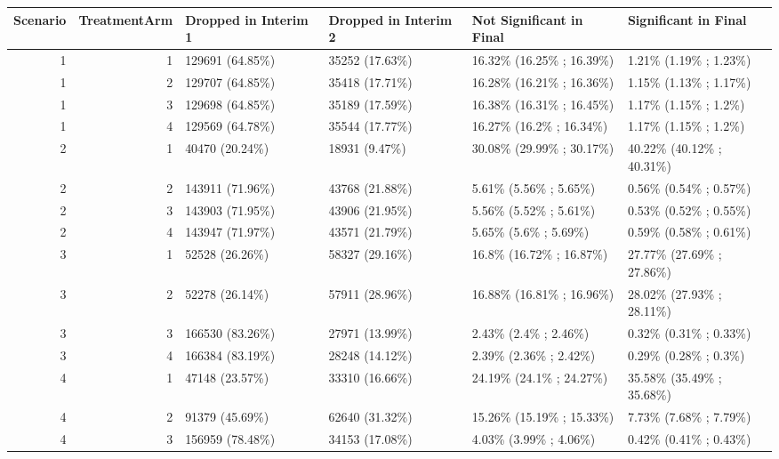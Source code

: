 \documentclass[11pt, a4paper]{article}\usepackage[]{graphicx}\usepackage[]{xcolor}
\begin{document}
\begin{landscape}
\begin{table}[ht]
\centering
\begin{tabular}{rrllll}
  \hline
Scenario & TreatmentArm & Dropped in Interim 1 & Dropped in Interim 2 & Not Significant in Final & Significant in Final \\ 
  \hline
  1 &   1 & 129691 (64.85\%) & 35252 (17.63\%) & 16.32\% (16.25\% ; 16.39\%) & 1.21\% (1.19\% ; 1.23\%) \\ 
    1 &   2 & 129707 (64.85\%) & 35418 (17.71\%) & 16.28\% (16.21\% ; 16.36\%) & 1.15\% (1.13\% ; 1.17\%) \\ 
    1 &   3 & 129698 (64.85\%) & 35189 (17.59\%) & 16.38\% (16.31\% ; 16.45\%) & 1.17\% (1.15\% ; 1.2\%) \\ 
    1 &   4 & 129569 (64.78\%) & 35544 (17.77\%) & 16.27\% (16.2\% ; 16.34\%) & 1.17\% (1.15\% ; 1.2\%) \\ 
   \hline 
  2 &   1 & 40470 (20.24\%) & 18931 (9.47\%) & 30.08\% (29.99\% ; 30.17\%) & 40.22\% (40.12\% ; 40.31\%) \\ 
    2 &   2 & 143911 (71.96\%) & 43768 (21.88\%) & 5.61\% (5.56\% ; 5.65\%) & 0.56\% (0.54\% ; 0.57\%) \\ 
    2 &   3 & 143903 (71.95\%) & 43906 (21.95\%) & 5.56\% (5.52\% ; 5.61\%) & 0.53\% (0.52\% ; 0.55\%) \\ 
    2 &   4 & 143947 (71.97\%) & 43571 (21.79\%) & 5.65\% (5.6\% ; 5.69\%) & 0.59\% (0.58\% ; 0.61\%) \\ 
   \hline 
  3 &   1 & 52528 (26.26\%) & 58327 (29.16\%) & 16.8\% (16.72\% ; 16.87\%) & 27.77\% (27.69\% ; 27.86\%) \\ 
    3 &   2 & 52278 (26.14\%) & 57911 (28.96\%) & 16.88\% (16.81\% ; 16.96\%) & 28.02\% (27.93\% ; 28.11\%) \\ 
    3 &   3 & 166530 (83.26\%) & 27971 (13.99\%) & 2.43\% (2.4\% ; 2.46\%) & 0.32\% (0.31\% ; 0.33\%) \\ 
    3 &   4 & 166384 (83.19\%) & 28248 (14.12\%) & 2.39\% (2.36\% ; 2.42\%) & 0.29\% (0.28\% ; 0.3\%) \\ 
   \hline 
  4 &   1 & 47148 (23.57\%) & 33310 (16.66\%) & 24.19\% (24.1\% ; 24.27\%) & 35.58\% (35.49\% ; 35.68\%) \\ 
    4 &   2 & 91379 (45.69\%) & 62640 (31.32\%) & 15.26\% (15.19\% ; 15.33\%) & 7.73\% (7.68\% ; 7.79\%) \\ 
    4 &   3 & 156959 (78.48\%) & 34153 (17.08\%) & 4.03\% (3.99\% ; 4.06\%) & 0.42\% (0.41\% ; 0.43\%) \\ 

\end{tabular}
\end{table}
\end{landscape}
\end{document}

